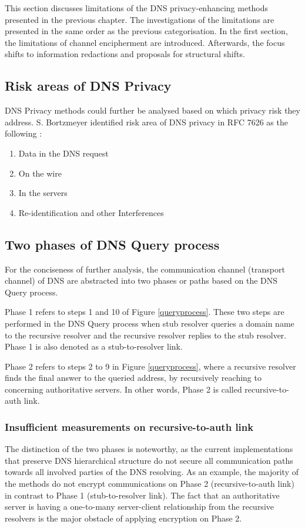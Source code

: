 This section discusses limitations of the DNS privacy-enhancing methods presented in the previous chapter.
The investigations of the limitations are presented in the same order as the previous categorisation. In the first section, the limitations of channel encipherment are introduced.
Afterwards, the focus shifts to information redactions and proposals for structural shifts.

\subsection{Risk areas of DNS Privacy}
DNS Privacy methods could further be analysed based on which privacy risk they address. S. Bortzmeyer identified risk area of DNS privacy in RFC 7626 as the following \cite{rfc7626}: 
\begin{enumerate}
    \item Data in the DNS request
    \item On the wire
    \item In the servers
    \item Re-identification and other Interferences
\end{enumerate}

\subsection{Two phases of DNS Query process}
For the conciseness of further analysis, the communication channel (transport channel) of DNS are abstracted into two phases or paths based on the DNS Query process.

Phase 1 refers to steps 1 and 10 of Figure \ref{queryprocess}. These two steps are performed in the DNS Query process when stub resolver queries a domain name to the recursive resolver and the recursive resolver replies to the stub resolver.
Phase 1 is also denoted as a stub-to-resolver link.

Phase 2 refers to steps 2 to 9 in Figure \ref{queryprocess}, where a recursive resolver finds the final answer to the queried address, by recursively reaching to concerning authoritative servers.
In other words, Phase 2 is called recursive-to-auth link.

\subsubsection{Insufficient measurements on recursive-to-auth link}\label{recursive-auth-limitations}
The distinction of the two phases is noteworthy, as the current implementations that preserve DNS hierarchical structure do not secure all communication paths towards all involved parties of the DNS resolving.
As an example, the majority of the methods do not encrypt communications on Phase 2 (recursive-to-auth link) in contrast to Phase 1 (stub-to-resolver link).
The fact that an authoritative server is having a one-to-many server-client relationship from the recursive resolvers is the major obstacle of applying encryption on Phase 2.

